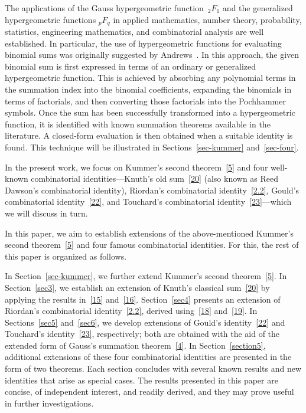 \documentclass[reqno]{amsart}
\numberwithin{equation}{section}
\theoremstyle{plain}
\theoremstyle{remark}
\begin{document}
\par
The applications of the Gauss hypergeometric function ${\,}_2F_1$ and the generalized hypergeometric functions ${}_pF_q$ in applied mathematics, number theory, probability, statistics, engineering mathematics, and combinatorial analysis are well established. In particular, the use of hypergeometric functions for evaluating binomial sums was originally suggested by Andrews~\cite{1}.
In this approach, the given binomial sum is first expressed in terms of an ordinary or generalized hypergeometric function. This is achieved by absorbing any polynomial terms in the summation index into the binomial coefficients, expanding the binomials in terms of factorials, and then converting those factorials into the Pochhammer symbols. Once the sum has been successfully transformed into a hypergeometric function, it is identified with known summation theorems available in the literature. A closed-form evaluation is then obtained when a suitable identity is found. This technique will be illustrated in Sections~\ref{sec-kummer} and~\ref{sec-four}.
\par
In the present work, we focus on Kummer's second theorem~\eqref{5} and four well-known combinatorial identities---Knuth's old sum~\eqref{20} (also known as Reed Dawson's combinatorial identity), Riordan's combinatorial identity~\eqref{2.2}, Gould's combinatorial identity~\eqref{22}, and Touchard's combinatorial identity~\eqref{23}---which we will discuss in turn.
\par
In this paper, we aim to establish extensions of the above-mentioned Kummer's second theorem~\eqref{5} and four famous combinatorial identities. For this, the rest of this paper is organized as follows.
\par
In Section~\ref{sec-kummer}, we further extend Kummer's second theorem~\eqref{5}. In Section~\ref{sec3}, we establish an extension of Knuth's classical sum~\eqref{20} by applying the results in~\eqref{15} and~\eqref{16}. Section~\ref{sec4} presents an extension of Riordan's combinatorial identity~\eqref{2.2}, derived using~\eqref{18} and~\eqref{19}. In Sections~\ref{sec5} and~\ref{sec6}, we develop extensions of Gould's identity~\eqref{22} and Touchard's identity~\eqref{23}, respectively; both are obtained with the aid of the extended form of Gauss's summation theorem~\eqref{4}. In Section~\ref{section5}, additional extensions of these four combinatorial identities are presented in the form of two theorems. Each section concludes with several known results and new identities that arise as special cases. The results presented in this paper are concise, of independent interest, and readily derived, and they may prove useful in further investigations.
\end{document}
